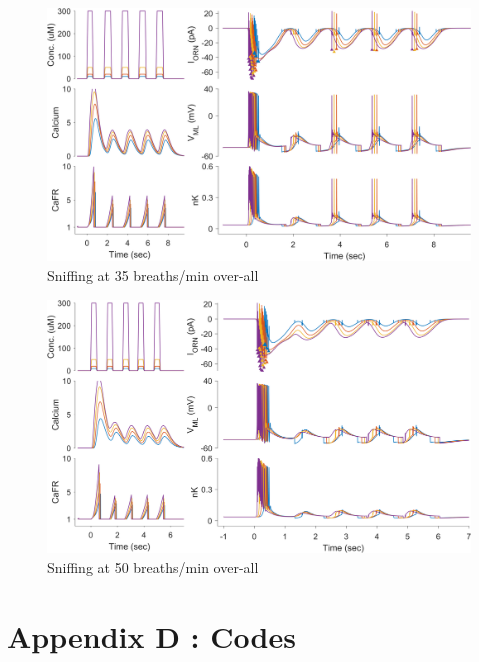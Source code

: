 \documentclass[
]{article}
\begin{document}
\begin{figure}

{\centering \includegraphics[width=0.95\linewidth]{figs/sniff/fig_spk_sniffing_35bpm} 

}

\caption{Sniffing at 35 breaths/min over-all}\label{fig:f35bpm}
\end{figure}

\begin{figure}

{\centering \includegraphics[width=0.95\linewidth]{figs/sniff/fig_spk_sniffing_50bpm} 

}

\caption{Sniffing at 50 breaths/min over-all}\label{fig:f50bpm}
\end{figure}

\clearpage

\hypertarget{appendix-d-codes}{%
\section*{Appendix D : Codes}\label{appendix-d-codes}}
\end{document}
